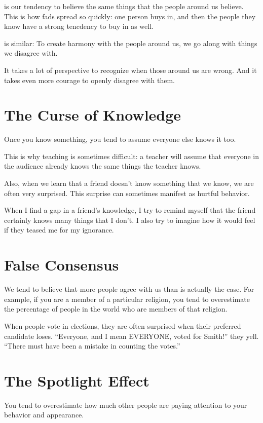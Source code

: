  is our tendency to believe the same
things that the people around us believe. This is how fads spread so
quickly: one person buys in, and then the people they know have a
strong tencdency to buy in as well.

 is similar: To create harmony with the
people around us, we go along with things we disagree with.

It takes a lot of perspective to recognize when those around us are
wrong. And it takes even more courage to openly disagree with them.

\section{The Curse of Knowledge}

Once you know something, you tend to assume everyone else knows it too.

This is why teaching is sometimes difficult: a teacher will assume
that everyone in the audience already knows the same things the
teacher knows.

Also, when we learn that a friend doesn't know something that we know,
we are often very surprised. This surprise can sometimes manifest as
hurtful behavior.

When I find a gap in a friend's knowledge, I try to remind myself that
the friend certainly knows many things that I don't. I also try to
imagine how it would feel if they teased me for my ignorance.

\section{False Consensus}

We tend to believe that more people agree with us than is actually
the case. For example, if you are a member of a particular religion,
you tend to overestimate the percentage of people in the world who are
members of that religion.

When people vote in elections, they are often surprised when their
preferred candidate loses. ``Everyone, and I mean EVERYONE, voted for
Smith!'' they yell.  ``There must have been a mistake in counting the
votes.''

\section{The Spotlight Effect}

You tend to overestimate how much other people are paying attention to
your behavior and appearance.

